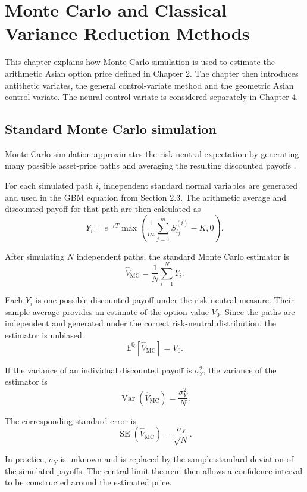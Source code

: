\chapter{Monte Carlo and Classical Variance Reduction Methods}

This chapter explains how Monte Carlo simulation is used to estimate the arithmetic Asian option price defined in Chapter 2. The chapter then introduces antithetic variates, the general control-variate method and the geometric Asian control variate. The neural control variate is considered separately in Chapter 4.

\section{Standard Monte Carlo simulation}

Monte Carlo simulation approximates the risk-neutral expectation by generating many possible asset-price paths and averaging the resulting discounted payoffs \parencite{boyle1977,glasserman2004}.

For each simulated path \(i\), independent standard normal variables are generated and used in the GBM equation from Section 2.3. The arithmetic average and discounted payoff for that path are then calculated as
\[
Y_i
=
e^{-rT}
\max\left(
\frac{1}{m}\sum_{j=1}^{m}S_{t_j}^{(i)}-K,0
\right).
\]

After simulating \(N\) independent paths, the standard Monte Carlo estimator is
\[
\widehat{V}_{\mathrm{MC}}
=
\frac{1}{N}\sum_{i=1}^{N}Y_i.
\]

Each \(Y_i\) is one possible discounted payoff under the risk-neutral measure. Their sample average provides an estimate of the option value \(V_0\). Since the paths are independent and generated under the correct risk-neutral distribution, the estimator is unbiased:
\[
\mathbb{E}^{\mathbb{Q}}
\left[
\widehat{V}_{\mathrm{MC}}
\right]
=
V_0.
\]

If the variance of an individual discounted payoff is \(\sigma_Y^2\), the variance of the estimator is
\[
\operatorname{Var}
\left(
\widehat{V}_{\mathrm{MC}}
\right)
=
\frac{\sigma_Y^2}{N}.
\]

The corresponding standard error is
\[
\operatorname{SE}
\left(
\widehat{V}_{\mathrm{MC}}
\right)
=
\frac{\sigma_Y}{\sqrt{N}}.
\]

In practice, \(\sigma_Y\) is unknown and is replaced by the sample standard deviation of the simulated payoffs. The central limit theorem then allows a confidence interval to be constructed around the estimated price.

